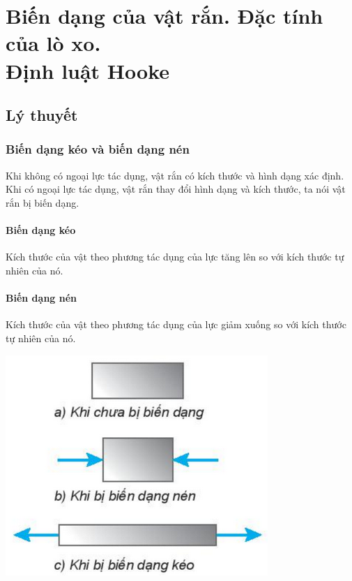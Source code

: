 \let\lesson\undefined
\newcommand{\lesson}{\phantomlesson{Bài 22 + 23: Biến dạng của vật rắn. Đặc tính của lò xo. Định luật Hooke}}
\chapter[Biến dạng của vật rắn. Đặc tính của lò xo.\\ Định luật Hooke]{Biến dạng của vật rắn. Đặc tính của lò xo.\\ Định luật Hooke}
\setcounter{section}{0}
\section{Lý thuyết}
\subsection{Biến dạng kéo và biến dạng nén}
Khi không có ngoại lực tác dụng, vật rắn có kích thước và hình dạng xác định. Khi có ngoại lực tác dụng, vật rắn thay đổi hình dạng và kích thước, ta nói vật rắn bị biến dạng.

\begin{minipage}{0.6\textwidth}
	\subsubsection{Biến dạng kéo}
Kích thước của vật theo phương tác dụng của lực tăng lên so với kích thước tự nhiên của nó.
	\subsubsection{Biến dạng nén}
Kích thước của vật theo phương tác dụng của lực giảm xuống so với kích thước tự nhiên của nó.
\end{minipage}
\begin{minipage}{0.4\textwidth}
	\begin{center}
		\includegraphics[scale=0.6]{../figs/G10-028-1}
	\end{center}
\end{minipage}
\vspace{-0.5cm}
